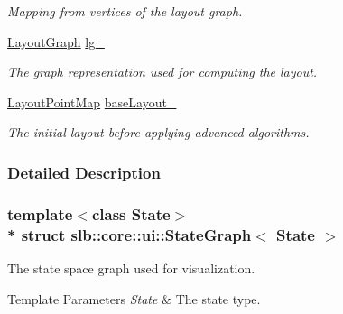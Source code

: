 \begin{DoxyCompactItemize}
\begin{DoxyCompactList}\small\item\em Mapping from vertices of the layout graph. \end{DoxyCompactList}\item 
\hyperlink{structslb_1_1core_1_1ui_1_1StateGraph_a891b8f21d1affa3c2d7f6d1ca008a48d}{Layout\+Graph} \hyperlink{structslb_1_1core_1_1ui_1_1StateGraph_aca03214581c231b20169c1ffacc159bd}{lg\+\_\+}\hypertarget{structslb_1_1core_1_1ui_1_1StateGraph_aca03214581c231b20169c1ffacc159bd}{}\label{structslb_1_1core_1_1ui_1_1StateGraph_aca03214581c231b20169c1ffacc159bd}

\begin{DoxyCompactList}\small\item\em The graph representation used for computing the layout. \end{DoxyCompactList}\item 
\hyperlink{structslb_1_1core_1_1ui_1_1StateGraph_a61fcf354fe3879a3f51438dbd1e37c8b}{Layout\+Point\+Map} \hyperlink{structslb_1_1core_1_1ui_1_1StateGraph_ab763fdf38ffd5e348faf99fc9d74be3c}{base\+Layout\+\_\+}\hypertarget{structslb_1_1core_1_1ui_1_1StateGraph_ab763fdf38ffd5e348faf99fc9d74be3c}{}\label{structslb_1_1core_1_1ui_1_1StateGraph_ab763fdf38ffd5e348faf99fc9d74be3c}

\begin{DoxyCompactList}\small\item\em The initial layout before applying advanced algorithms. \end{DoxyCompactList}\end{DoxyCompactItemize}


\subsubsection{Detailed Description}
\subsubsection*{template$<$class State$>$\\*
struct slb\+::core\+::ui\+::\+State\+Graph$<$ State $>$}

The state space graph used for visualization. 


\begin{DoxyTemplParams}{Template Parameters}
{\em State} & The state type. \\
\hline
\end{DoxyTemplParams}


